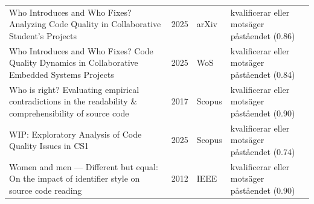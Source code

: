 \begin{longtable}{@{}%
  >{\raggedright\arraybackslash}p{}c%
  >{\raggedright\arraybackslash}p{}%
  >{\raggedright\arraybackslash}p{}@{}}
Who Introduces and Who Fixes? Analyzing Code Quality in Collaborative Student's Projects & 2025 & arXiv & kvalificerar eller motsäger påståendet (0.86) \\
Who Introduces and Who Fixes? Code Quality Dynamics in Collaborative Embedded Systems Projects & 2025 & WoS & kvalificerar eller motsäger påståendet (0.84) \\
Who is right? Evaluating empirical contradictions in the readability \& comprehensibility of source code & 2017 & Scopus & kvalificerar eller motsäger påståendet (0.90) \\
WIP: Exploratory Analysis of Code Quality Issues in CS1 & 2025 & Scopus & kvalificerar eller motsäger påståendet (0.74) \\
Women and men --- Different but equal: On the impact of identifier style on source code reading & 2012 & IEEE & kvalificerar eller motsäger påståendet (0.90) \\
\end{longtable}
\endgroup
